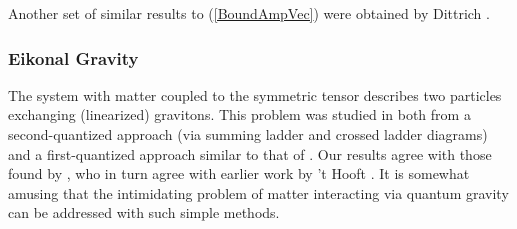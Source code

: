 Another set of similar results to (\ref{BoundAmpVec}) were obtained by Dittrich \cite{Dittrich}.
\subsubsection{Eikonal Gravity}
The system with matter coupled to the symmetric tensor describes two particles exchanging (linearized) gravitons. This problem was studied in \cite{KabatOrtiz} both from a second-quantized approach (via summing ladder and crossed ladder diagrams) and a first-quantized approach similar to that of \cite{AbarbItzyk}. Our results agree with those found by \cite{KabatOrtiz}, who in turn agree with earlier work by 't Hooft \cite{tHooftPL,tHooftNPB}. It is somewhat amusing that the intimidating problem of matter interacting via quantum gravity can be addressed with such simple methods.
